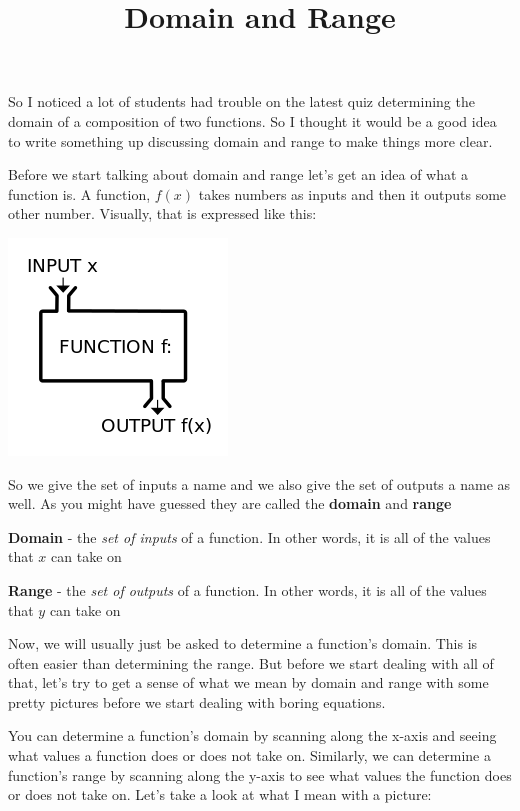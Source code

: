 \documentclass[12pt]{article}
\begin{document}
\title{Domain and Range}
\date{}
\author{}
\maketitle

So I noticed a lot of students had trouble on the latest quiz determining the domain of a composition of two functions. So I thought it would be a good idea to write something up discussing domain and range to make things more clear. 

Before we start talking about domain and range let's get an idea of what a function is. A function, $f(x)$ takes numbers as inputs and then it outputs some other number. Visually, that is expressed like this:

\centerline{\includegraphics{Function.png}}

So we give the set of inputs a name and we also give the set of outputs a name as well. As you might have guessed they are called the \textbf{domain} and \textbf{range}
\newpage

\textbf{Domain} - the \textit{set of inputs} of a function. In other words, it is all of the values that $x$ can take on

\textbf{Range} - the \textit{set of outputs} of a function. In other words, it is all of the values that $y$ can take on

Now, we will usually just be asked to determine a function's domain. This is often easier than determining the range. But before we start dealing with all of that, let's try to get a sense of what we mean by domain and range with some pretty pictures before we start dealing with boring equations.

You can determine a function's domain by scanning along the x-axis and seeing what values a function does or does not take on. Similarly, we can determine a function's range by scanning along the y-axis to see what values the function does or does not take on. Let's take a look at what I mean with a picture:
\end{document}
